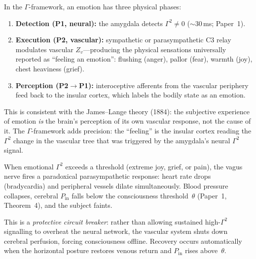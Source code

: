 \documentclass[aps,pre,twocolumn,superscriptaddress,floatfix]{revtex4-2}
\begin{document}
\begin{remark}
\label{rem:emotion-vascular}
In the $\Gamma$-framework, an emotion has three
physical phases:
\begin{enumerate}
  \item \textbf{Detection (P1, neural):}
    the amygdala detects $\Gamma^2 \neq 0$
    ($\sim$30\,ms; Paper~1).
  \item \textbf{Execution (P2, vascular):}
    sympathetic or parasympathetic C3 relay
    modulates vascular $Z_v$---producing the
    physical sensations universally reported as
    ``feeling an emotion'': flushing (anger),
    pallor (fear), warmth (joy),
    chest heaviness (grief).
  \item \textbf{Perception (P2$\to$P1):}
    interoceptive afferents from the vascular
    periphery feed back to the insular cortex,
    which labels the bodily state as an emotion.
\end{enumerate}
This is consistent with the James--Lange theory
(1884): the subjective experience of emotion
\emph{is} the brain's perception of its own
vascular response, not the cause of it.
The $\Gamma$-framework adds precision: the
``feeling'' is the insular cortex reading the
$\Gamma^2$ change in the vascular tree that was
triggered by the amygdala's neural $\Gamma^2$ signal.
\end{remark}

\begin{remark}
\label{rem:vasovagal}
When emotional $\Gamma^2$ exceeds a threshold (extreme
joy, grief, or pain), the vagus nerve fires a
paradoxical parasympathetic response:
heart rate drops (bradycardia) and peripheral vessels
dilate simultaneously.
Blood pressure collapses, cerebral $P_{\text{in}}$
falls below the consciousness threshold~$\theta$
(Paper~1, Theorem~4), and the subject faints.

This is a \emph{protective circuit breaker}:
rather than allowing sustained high-$\Gamma^2$
signalling to overheat the neural network,
the vascular system shuts down cerebral perfusion,
forcing consciousness offline.
Recovery occurs automatically when the horizontal
posture restores venous return and $P_{\text{in}}$
rises above~$\theta$.
\end{remark}
\end{document}
